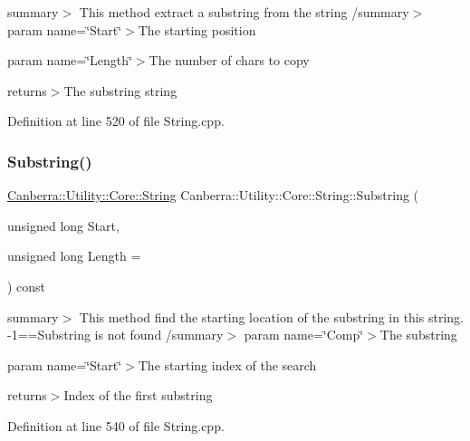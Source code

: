 summary$>$ This method extract a substring from the string /summary$>$ param name=\char`\"{}\+Start\char`\"{}$>$The starting position

param name=\char`\"{}\+Length\char`\"{}$>$The number of chars to copy

returns$>$The substring string

Definition at line 520 of file String.\+cpp.

\mbox{\label{class_canberra_1_1_utility_1_1_core_1_1_string_a5e9c70c1fbed98b6b04917bde6e71759_a5e9c70c1fbed98b6b04917bde6e71759}} 
\subsubsection{\texorpdfstring{Substring()}{Substring()}}
{\footnotesize\ttfamily \hyperlink{class_canberra_1_1_utility_1_1_core_1_1_string}{Canberra\+::\+Utility\+::\+Core\+::\+String} Canberra\+::\+Utility\+::\+Core\+::\+String\+::\+Substring (\begin{DoxyParamCaption}\item[{unsigned long}]{Start,  }\item[{unsigned long}]{Length = {} }\end{DoxyParamCaption}) const}

summary$>$ This method find the starting location of the substring in this string. -\/1==Substring is not found /summary$>$ param name=\char`\"{}\+Comp\char`\"{}$>$The substring

param name=\char`\"{}\+Start\char`\"{}$>$The starting index of the search

returns$>$Index of the first substring

Definition at line 540 of file String.\+cpp.

\mbox{\label{class_canberra_1_1_utility_1_1_core_1_1_string_a21375ea3dfb78cc46e30ce95ae6a17bf_a21375ea3dfb78cc46e30ce95ae6a17bf}} 

